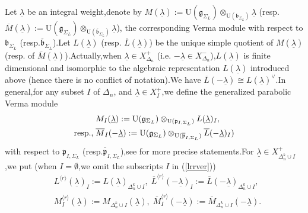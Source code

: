 \documentclass[SecEq,CM,GP]{degruyter-crelle} %
\theoremstyle{plain}
\newcommand{\lrr}{{\langle r\rangle}}
\newcommand{\ul}{\underline}
\newcommand{\fb}{{\mathfrak{b}}}
\newcommand{\fg}{{\mathfrak{g}}}
\newcommand{\fp}{{\mathfrak{p}}}
\newcommand{\sW}{\mathscr W}
\begin{document}
Let $\ul{\lambda}$ be an integral weight,\;denote by $M(\ul{\lambda}):=\text{U}(\fg_{\Sigma_L})\otimes_{\text{U}(\fb_{\Sigma_L})} \ul{\lambda}$ (resp. $\overline{M}(\ul{\lambda}):=\text{U}(\fg_{\Sigma_L})\otimes_{\text{U}(\overline{\fb}_{\Sigma_L})} \ul{\lambda}$), the corresponding Verma module with respect to $\fb_{\Sigma_L}$ (resp.\;$\overline{\fb}_{\Sigma_L}$).\;Let $L(\ul{\lambda})$ (resp. $\overline{L}(\ul{\lambda})$) be the unique simple quotient of $M(\ul{\lambda})$ (resp. of $\overline{M}(\ul{\lambda})$).\;Actually,\;when $\ul{\lambda}\in X_{\Delta_n}^+$ (i.e. $-\ul{\lambda}\in X_{\Delta_n}^-$),\;$L(\ul{\lambda})$ is finite dimensional and  isomorphic to the algebraic representation $L(\ul{\lambda})$ introduced above (hence there is no conflict of notation).\;We have $\overline{L}(-\ul{\lambda})\cong L(\ul{\lambda})^{\vee}$.\;In general,\;for any subset $I$ of $\Delta_n$, and $\ul{\lambda}\in X_{I}^+$,\;we define the generalized parabolic Verma module
\begin{equation}
	\begin{aligned}
		&M_I(\ul{\lambda}):=\text{U}(\fg_{\Sigma_L})\otimes_{\text{U}(\fp_{I,\Sigma_L})} L(\ul{\lambda})_I,\;\\
	 \text{resp.,\;}&\overline{M}_I(-\ul{\lambda}):=\text{U}(\fg_{\Sigma_L})\otimes_{\text{U}(\overline{\fp}_{I,\Sigma_L})} \overline{L}(-\ul{\lambda})_I)
	\end{aligned}
\end{equation}
with respect to $\fp_{I,\Sigma_L}$ (resp.\;$\overline{\fp}_{I,\Sigma_L}$),\;see \cite[ Chapter 9]{humphreysBGG} for more precise statements.\;For $\ul{\lambda}\in X_{\Delta_n^k\cup I}^+$,\;we put (when $I=\emptyset$,\;we omit the subscripts $I$ in (\ref{lrrver}))
\begin{equation}\label{lrrver}
\begin{aligned}
	&L^{\lrr}(\ul{\lambda})_I:=L(\ul{\lambda})_{\Delta_n^k\cup I},\;\overline{L}^{\lrr}(-\ul{\lambda})_I:=\overline{L}(-\ul{\lambda})_{\Delta_n^k\cup I},\;\\
	&{M}_I^{\lrr}(\ul{\lambda}):={M}_{\Delta_n^k\cup I}(\ul{\lambda}),\;\overline{M}_I^{\lrr}(-\ul{\lambda}):=\overline{{M}}_{\Delta_n^k\cup I}(-\ul{\lambda}).
\end{aligned}
\end{equation}

\end{document}
